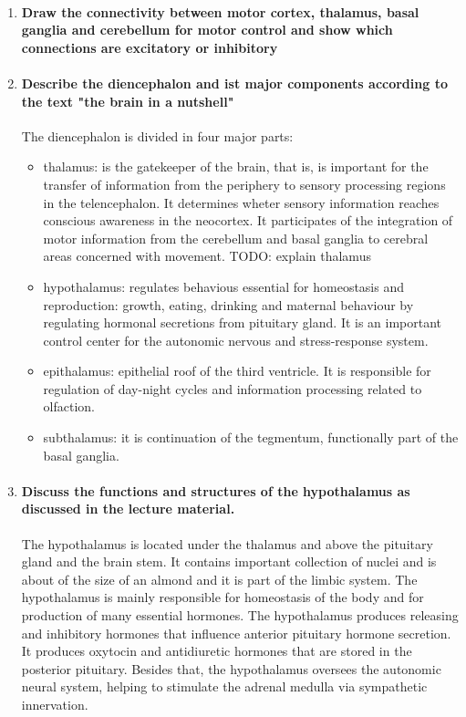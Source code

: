 \documentclass[12pt,article,oneside,a4paper]{memoir}
\begin{document}
\begin{enumerate}
\item \paragraph{Draw the connectivity between motor cortex, thalamus, basal ganglia and cerebellum for motor control and show which connections are excitatory or inhibitory}

\item \paragraph{Describe the diencephalon and ist major components according to the text "the brain in a nutshell"}
The diencephalon is divided in four major parts:
\begin{itemize}
\item thalamus: is the gatekeeper of the brain, that is, is important for the transfer of information from the periphery to sensory processing regions in the telencephalon. It determines wheter sensory information reaches conscious awareness in the neocortex. It participates of the integration of motor information from the cerebellum and basal ganglia to cerebral areas concerned with movement.
\subitem TODO: explain thalamus 
\item hypothalamus: regulates behavious essential for homeostasis and reproduction: growth, eating, drinking and maternal behaviour by regulating hormonal secretions from pituitary gland. It is an important control center for the autonomic nervous and stress-response system.
\item epithalamus: epithelial roof of the third ventricle. It is responsible for regulation of day-night cycles and information processing related to olfaction.
\item subthalamus: it is continuation of the tegmentum, functionally part of the basal ganglia.
\end{itemize}

\item \paragraph{Discuss the functions and structures of the hypothalamus as discussed in the lecture material.}\label{question:hypothalamus}
The hypothalamus is located under the thalamus and above the pituitary gland and the brain stem. It contains important collection of nuclei and is about of the size of an almond and it is part of the limbic system. The hypothalamus is mainly responsible for homeostasis of the body and for production of many essential hormones. The hypothalamus produces releasing and inhibitory hormones that influence anterior pituitary hormone secretion. It produces oxytocin and antidiuretic hormones that are stored in the posterior pituitary. Besides that, the hypothalamus oversees the autonomic neural system, helping to stimulate the adrenal medulla via sympathetic innervation.


\end{enumerate}
\end{document}
